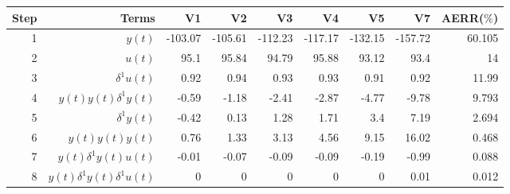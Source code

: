 \begin{tabular}{rrrrrrrrr}
Step & Terms & V1 & V2 & V3 & V4 & V5 & V7 & AERR($\%$) \\ 
\hline 
1 & $y(t)$ & -103.07 & -105.61 & -112.23 & -117.17 & -132.15 & -157.72 & 60.105 \\ 
2 & $u(t)$ & 95.1 & 95.84 & 94.79 & 95.88 & 93.12 & 93.4 & 14 \\ 
3 & $\delta^1 u(t)$ & 0.92 & 0.94 & 0.93 & 0.93 & 0.91 & 0.92 & 11.99 \\ 
4 & $y(t)y(t)\delta^1 y(t)$ & -0.59 & -1.18 & -2.41 & -2.87 & -4.77 & -9.78 & 9.793 \\ 
5 & $\delta^1 y(t)$ & -0.42 & 0.13 & 1.28 & 1.71 & 3.4 & 7.19 & 2.694 \\ 
6 & $y(t)y(t)y(t)$ & 0.76 & 1.33 & 3.13 & 4.56 & 9.15 & 16.02 & 0.468 \\ 
7 & $y(t)\delta^1 y(t)u(t)$ & -0.01 & -0.07 & -0.09 & -0.09 & -0.19 & -0.99 & 0.088 \\ 
8 & $y(t)\delta^1 y(t)\delta^1 u(t)$ & 0 & 0 & 0 & 0 & 0 & 0.01 & 0.012 \\ 
\hline 
\end{tabular}